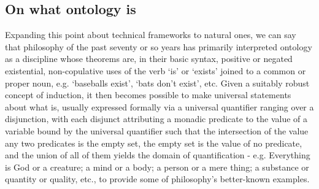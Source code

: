 \documentclass[]{article}
\begin{document}
\subsection{On what ontology is}
Expanding this point about technical frameworks to natural ones,
we can say that 
philosophy of the past seventy or so years has primarily interpreted ontology 
as a discipline whose theorems are, 
in their basic syntax, 
positive or negated existential, non-copulative uses of the verb `is' or `exists' joined to a common or proper noun, 
e.g. `baseballs exist', `bats don't exist', etc. 
Given a suitably robust concept of induction, it then becomes possible to make universal statements about what is, 
usually expressed formally via a universal quantifier ranging over a disjunction, 
with each disjunct
attributing a monadic predicate to the value of a variable bound by the universal
quantifier 
such that 
the intersection of the value any two predicates is the empty set, 
the empty set is the value of no predicate, 
and the union of all of them
yields the domain of quantification - 
e.g. Everything is God or a creature; 
a mind or a body; 
a person or a mere thing; 
a substance or quantity or quality, etc., 
to provide some of philosophy's better-known examples. 
\end{document}
